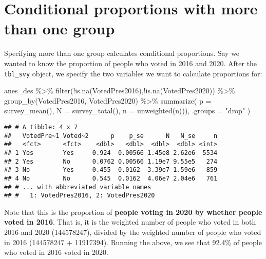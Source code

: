 \documentclass[
]{krantz}
\makeatletter
\newenvironment{Shaded}{\begin{snugshade}}{\end{snugshade}}
\newcommand{\AttributeTok}[1]{\textcolor[rgb]{0.61,0.61,0.61}{#1}}
\newcommand{\FunctionTok}[1]{\textcolor[rgb]{0,0,0}{#1}}
\newcommand{\NormalTok}[1]{#1}
\newcommand{\SpecialCharTok}[1]{\textcolor[rgb]{0,0,0}{#1}}
\newcommand{\StringTok}[1]{\textcolor[rgb]{0.5,0.5,0.5}{#1}}
\newenvironment{kframe}{%
\medskip{}
\setlength{\fboxsep}{.8em}
 \def\at@end@of@kframe{}%
 \ifinner\ifhmode%
  \def\at@end@of@kframe{\end{minipage}}%
  \begin{minipage}{\columnwidth}%
 \fi\fi%
 \def\FrameCommand##1{\hskip\@totalleftmargin \hskip-\fboxsep
 \colorbox{shadecolor}{##1}\hskip-\fboxsep
     \hskip-\linewidth \hskip-\@totalleftmargin \hskip\columnwidth}%
 \MakeFramed {\advance\hsize-\width
   \@totalleftmargin\z@ \linewidth\hsize
   \@setminipage}}%
 {\par\unskip\endMakeFramed%
 \at@end@of@kframe}
\renewenvironment{Shaded}{\begin{kframe}}{\end{kframe}}
\makeatother
\begin{document}
\hypertarget{conditional-proportions-with-more-than-one-group}{%
\section{Conditional proportions with more than one group}\label{conditional-proportions-with-more-than-one-group}}

Specifying more than one group calculates conditional proportions. Say we wanted to know the proportion of people who voted in 2016 and 2020. After the \texttt{tbl\_svy} object, we specify the two variables we want to calculate proportions for:

\begin{Shaded}
\begin{Highlighting}[]
\NormalTok{anes\_des }\SpecialCharTok{\%\textgreater{}\%}
  \FunctionTok{filter}\NormalTok{(}\SpecialCharTok{!}\FunctionTok{is.na}\NormalTok{(VotedPres2016),}\SpecialCharTok{!}\FunctionTok{is.na}\NormalTok{(VotedPres2020)) }\SpecialCharTok{\%\textgreater{}\%}
  \FunctionTok{group\_by}\NormalTok{(VotedPres2016, VotedPres2020) }\SpecialCharTok{\%\textgreater{}\%}
  \FunctionTok{summarize}\NormalTok{(}
    \AttributeTok{p =} \FunctionTok{survey\_mean}\NormalTok{(),}
    \AttributeTok{N =} \FunctionTok{survey\_total}\NormalTok{(),}
    \AttributeTok{n =} \FunctionTok{unweighted}\NormalTok{(}\FunctionTok{n}\NormalTok{()),}
    \AttributeTok{.groups =} \StringTok{"drop"}
\NormalTok{  )}
\end{Highlighting}
\end{Shaded}

\begin{verbatim}
## # A tibble: 4 x 7
##   VotedPre~1 Voted~2      p    p_se      N   N_se     n
##   <fct>      <fct>    <dbl>   <dbl>  <dbl>  <dbl> <int>
## 1 Yes        Yes     0.924  0.00566 1.45e8 2.62e6  5534
## 2 Yes        No      0.0762 0.00566 1.19e7 9.55e5   274
## 3 No         Yes     0.455  0.0162  3.39e7 1.59e6   859
## 4 No         No      0.545  0.0162  4.06e7 2.04e6   761
## # ... with abbreviated variable names
## #   1: VotedPres2016, 2: VotedPres2020
\end{verbatim}

Note that this is the proportion of \textbf{people voting in 2020 by whether people voted in 2016}. That is, it is the weighted number of people who voted in both 2016 and 2020 (144578247), divided by the weighted number of people who voted in 2016 (144578247 + 11917394). Running the above, we see that 92.4\% of people who voted in 2016 voted in 2020.
\end{document}

